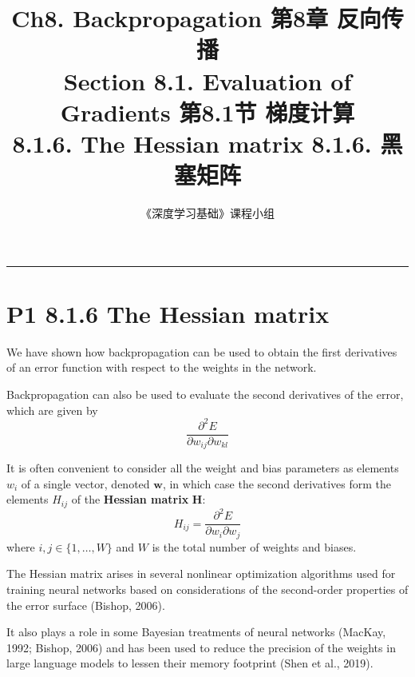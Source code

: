 \documentclass{article}
\title{Ch8. Backpropagation \hfill 第8章 反向传播 \\ 
Section 8.1. Evaluation of Gradients \hfill 第8.1节 梯度计算 \\ 
8.1.6. The Hessian matrix \hfill 8.1.6. 黑塞矩阵}
\author{《深度学习基础》课程小组}
\begin{document}
\maketitle

\setlength{\parindent}{0pt} %
\setlength{\parskip}{1.5em} %

\noindent\rule{\linewidth}{0.4pt}

\section{P1 8.1.6 The Hessian matrix}

We have shown how backpropagation can be used to obtain the first derivatives of an error function with respect to the weights in the network. 

Backpropagation can also be used to evaluate the second derivatives of the error, which are given by
\begin{equation}
    \frac{\partial^2 E}{\partial w_{ij} \partial w_{kl}}
    \tag{8.36}
\end{equation}

It is often convenient to consider all the weight and bias parameters as elements $w_i$ of a single vector, denoted $\mathbf{w}$, in which case the second derivatives form the elements $H_{ij}$ of the \textbf{Hessian matrix} $\mathbf{H}$:
\begin{equation}
    H_{ij} = \frac{\partial^2 E}{\partial w_i \partial w_j}
    \tag{8.37}
\end{equation}
where $i, j \in \{1, \ldots, W\}$ and $W$ is the total number of weights and biases. 

The Hessian matrix arises in several nonlinear optimization algorithms used for training neural networks based on considerations of the second-order properties of the error surface (Bishop, 2006). 

It also plays a role in some Bayesian treatments of neural networks (MacKay, 1992; Bishop, 2006) and has been used to reduce the precision of the weights in large language models to lessen their memory footprint (Shen et al., 2019).
\end{document}
